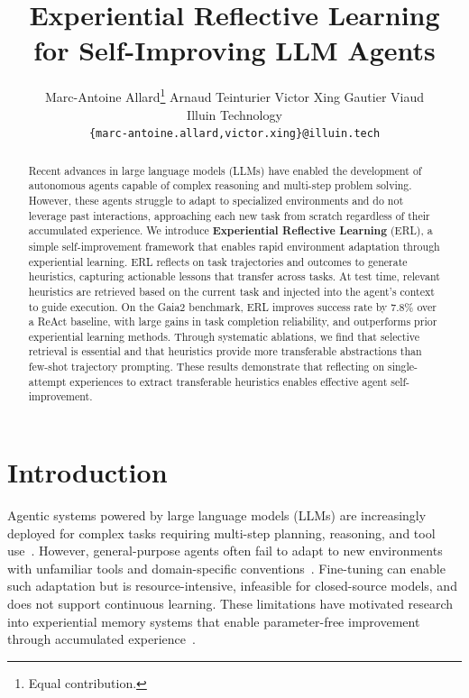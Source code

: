 \documentclass{article}
\title{Experiential Reflective Learning for Self-Improving LLM Agents}
\author{Marc-Antoine Allard\thanks{Equal contribution.}\quad
  Arnaud Teinturier\footnotemark[1]\quad
  Victor Xing\footnotemark[1]\quad
  Gautier Viaud \\[0.5ex]
  Illuin Technology\\
  \texttt{\{marc-antoine.allard,victor.xing\}@illuin.tech} \\
}
\begin{document}
\maketitle

\begin{abstract}
  Recent advances in large language models (LLMs) have enabled the development of autonomous agents capable of complex reasoning and multi-step problem solving. However, these agents struggle to adapt to specialized environments and do not leverage past interactions, approaching each new task from scratch regardless of their accumulated experience. We introduce \textbf{Experiential Reflective Learning} (ERL), a simple self-improvement framework that enables rapid environment adaptation through experiential learning. ERL reflects on task trajectories and outcomes to generate heuristics, capturing actionable lessons that transfer across tasks. At test time, relevant heuristics are retrieved based on the current task and injected into the agent's context to guide execution. On the Gaia2 benchmark, ERL improves success rate by 7.8\% over a ReAct baseline, with large gains in task completion reliability, and outperforms prior experiential learning methods. Through systematic ablations, we find that selective retrieval is essential and that heuristics provide more transferable abstractions than few-shot trajectory prompting. These results demonstrate that reflecting on single-attempt experiences to extract transferable heuristics enables effective agent self-improvement.
\end{abstract}

\section{Introduction}
Agentic systems powered by large language models (LLMs) are increasingly deployed for complex tasks requiring multi-step planning, reasoning, and tool use~\citep{luo2025mcpuniversebenchmarkinglargelanguage, yao2025taubench, wei2025browsecompsimplechallengingbenchmark}. However, general-purpose agents often fail to adapt to new environments with unfamiliar tools and domain-specific conventions~\citep{chen2026groundedtesttimeadaptationllm}. Fine-tuning can enable such adaptation but is resource-intensive, infeasible for closed-source models, and does not support continuous learning. These limitations have motivated research into experiential memory systems that enable parameter-free improvement through accumulated experience~\citep{hu2026memoryageaiagents}.
\end{document}
